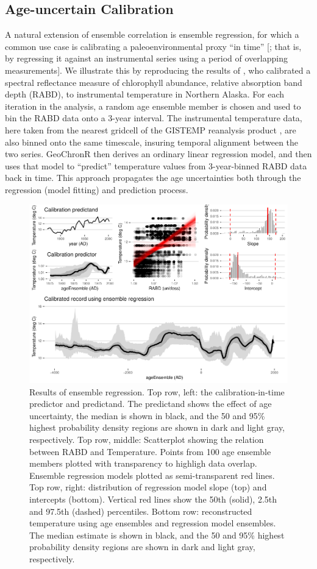 \documentclass[gchron, manuscript]{copernicus}
\begin{document}
\subsection{Age-uncertain Calibration}

A natural extension of ensemble correlation is ensemble regression, for which a common use case is calibrating a paleoenvironmental proxy ``in time'' {[}\citet{grosjean2009calibration}; that is, by regressing it against an instrumental series using a period of overlapping measurements{]}. We illustrate this by reproducing the results of \citet{Boldt2015}, who calibrated a spectral reflectance measure of chlorophyll abundance, relative absorption band depth (RABD), to instrumental temperature in Northern Alaska.
For each iteration in the analysis, a random age ensemble member is chosen and used to bin the RABD data onto a 3-year interval.
The instrumental temperature data, here taken from the nearest gridcell of the GISTEMP reanalysis product \citep{hansen2010global}, are also binned onto the same timescale, insuring temporal alignment between the two series.
GeoChronR then derives an ordinary linear regression model, and then uses that model to ``predict'' temperature values from 3-year-binned RABD data back in time.
This approach propagates the age uncertainties both through the regression (model fitting) and prediction process.

\begin{figure}
\includegraphics[width=12cm]{geoChronR-paper_files/figure-latex/regression-1} \caption{Results of ensemble regression. Top row, left: the calibration-in-time predictor and predictand. The predictand shows the effect of age uncertainty, the median is shown in black, and the 50 and 95\% highest probability density regions are shown in dark and light gray, respectively. Top row, middle: Scatterplot showing the relation between RABD and Temperature. Points from 100 age ensemble members plotted with transparency to highligh data overlap. Ensemble regression models plotted as semi-transparent red lines. Top row, right: distribution of regression model slope (top) and intercepts (bottom). Vertical red lines show the 50th (solid), 2.5th and 97.5th (dashed) percentiles. Bottom row: reconstructed temperature using age ensembles and regression model ensembles. The median estimate is shown in black, and the 50 and 95\% highest probability density regions are shown in dark and light gray, respectively.}\label{fig:regression}
\end{figure}
\end{document}
